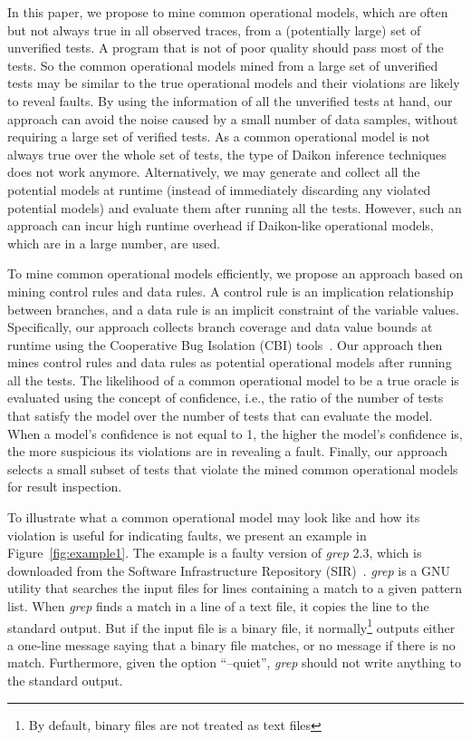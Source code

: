 \documentclass{sig-alternate}
\begin{document}
In this paper, we propose to mine common operational models, which
are often but not always true in all observed traces, from a
(potentially large) set of unverified tests. A program that is not
of poor quality should pass most of the tests. So the common
operational models mined from a large set of unverified tests may be
similar to the true operational models and their violations are
likely to reveal faults. By using the information of all the
unverified tests at hand, our approach can avoid the noise caused by
a small number of data samples, without requiring a large set of
verified tests. As a common operational model is not always true
over the whole set of tests, the type of Daikon inference techniques
does not work anymore. Alternatively, we may generate and collect
all the potential models at runtime (instead of immediately
discarding any violated potential models) and evaluate them after
running all the tests. However, such an approach can incur high
runtime overhead if Daikon-like operational models, which are in a
large number, are used.






To mine common operational models efficiently, we propose an
approach based on mining control rules and data rules. A control
rule is an implication relationship between branches, and a data
rule is an implicit constraint of the variable values. Specifically,
our approach collects branch coverage and data value bounds at
runtime using the Cooperative Bug Isolation (CBI)
tools~\cite{Liblit04}. Our approach then mines control rules and
data rules as potential operational models after running all the
tests. The likelihood of a common operational model to be a true
oracle is evaluated using the concept of confidence, i.e., the ratio
of the number of tests that satisfy the model over the number of
tests that can evaluate the model. When a model's confidence is not
equal to 1, the higher the model's confidence is, the more
suspicious its violations are in revealing a fault. Finally, our
approach selects a small subset of tests that violate the mined
common operational models for result inspection.


To illustrate what a common operational model may look like and how
its violation is useful for indicating faults, we present an example
in Figure~\ref{fig:example1}. The example is a faulty version of
\emph{grep} 2.3, which is downloaded from the Software
Infrastructure Repository (SIR)~\cite{SIR}. \emph{grep} is a GNU
utility that searches the input files for lines containing a match
to a given pattern list. When \emph{grep} finds a match in a line of
a text file, it copies the line to the standard output. But if the
input file is a binary file, it normally\footnote{By default, binary
files are not treated as text files} outputs either a one-line
message saying that a binary file matches, or no message if there is
no match. Furthermore, given the option ``--quiet'', \emph{grep}
should not write anything to the standard output.
\end{document}
